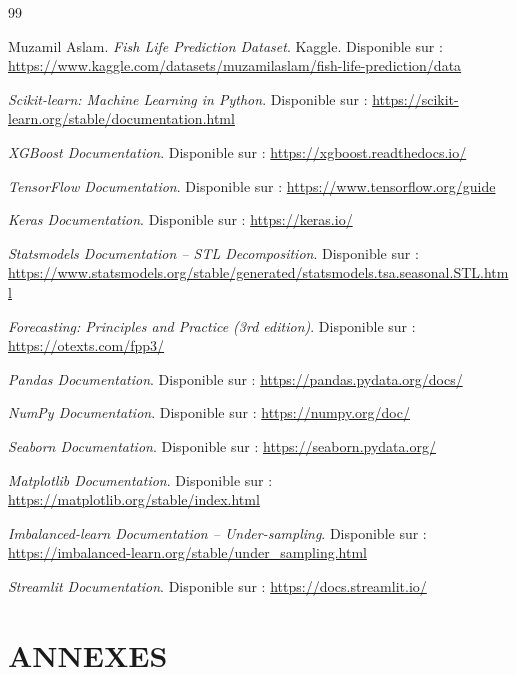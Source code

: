 \documentclass[a4paper,12pt, oneside]{article}
\begin{document}
\newpage

\renewcommand{\refname}{\hfil WEBOGRPAHIE \hfil}
\begin{thebibliography}{99}

Muzamil Aslam.
\newline \textit{Fish Life Prediction Dataset}. Kaggle. Disponible sur : \url{https://www.kaggle.com/datasets/muzamilaslam/fish-life-prediction/data}

\textit{Scikit-learn: Machine Learning in Python}. Disponible sur : \url{https://scikit-learn.org/stable/documentation.html}

\textit{XGBoost Documentation}. Disponible sur : \url{https://xgboost.readthedocs.io/}

\textit{TensorFlow Documentation}. Disponible sur : \url{https://www.tensorflow.org/guide}

\textit{Keras Documentation}. Disponible sur : \url{https://keras.io/}

\textit{Statsmodels Documentation -- STL Decomposition}. Disponible sur : \url{https://www.statsmodels.org/stable/generated/statsmodels.tsa.seasonal.STL.html}

\textit{Forecasting: Principles and Practice (3rd edition)}. Disponible sur : \url{https://otexts.com/fpp3/}

\textit{Pandas Documentation}. Disponible sur : \url{https://pandas.pydata.org/docs/}

\textit{NumPy Documentation}. Disponible sur : \url{https://numpy.org/doc/}

\textit{Seaborn Documentation}. Disponible sur : \url{https://seaborn.pydata.org/}

\textit{Matplotlib Documentation}. Disponible sur : \url{https://matplotlib.org/stable/index.html}

\textit{Imbalanced-learn Documentation -- Under-sampling}. Disponible sur : \url{https://imbalanced-learn.org/stable/under_sampling.html}

\textit{Streamlit Documentation}. Disponible sur : \url{https://docs.streamlit.io/}

\end{thebibliography}
\vspace*{\fill}
\newpage
\singlespacing 
\section*{\hfil ANNEXES \hfill}
\end{document}

